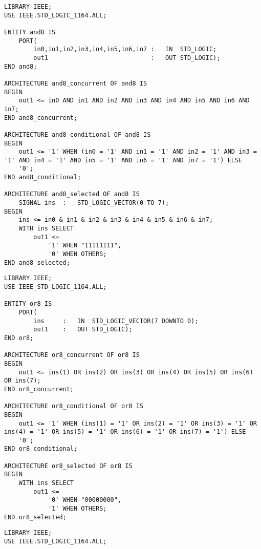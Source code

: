 \begin{enumerate}
	\begin{minipage}{1\linewidth}
		\item
		\begin{lstlisting}
LIBRARY IEEE;
USE IEEE.STD_LOGIC_1164.ALL;

ENTITY and8 IS
	PORT(
		in0,in1,in2,in3,in4,in5,in6,in7	:	IN	STD_LOGIC;
		out1							:	OUT	STD_LOGIC);
END and8;

ARCHITECTURE and8_concurrent OF and8 IS
BEGIN
	out1 <= in0 AND in1 AND in2 AND in3 AND in4 AND in5 AND in6 AND in7;
END and8_concurrent;

ARCHITECTURE and8_conditional OF and8 IS
BEGIN
	out1 <= '1' WHEN (in0 = '1' AND in1 = '1' AND in2 = '1' AND in3 = '1' AND in4 = '1' AND in5 = '1' AND in6 = '1' AND in7 = '1') ELSE
	'0';
END and8_conditional;

ARCHITECTURE and8_selected OF and8 IS
	SIGNAL ins	:	STD_LOGIC_VECTOR(0 TO 7);
BEGIN
	ins <= in0 & in1 & in2 & in3 & in4 & in5 & in6 & in7;
	WITH ins SELECT
		out1 <=
			'1' WHEN "11111111",
			'0' WHEN OTHERS;
END and8_selected;
		\end{lstlisting}
	\end{minipage}

	\begin{minipage}{1\linewidth}
		\item
		\begin{lstlisting}
LIBRARY IEEE;
USE IEEE_STD_LOGIC_1164.ALL;

ENTITY or8 IS
	PORT(
		ins		:	IN	STD_LOGIC_VECTOR(7 DOWNTO 0);
		out1	:	OUT	STD_LOGIC);
END or8;

ARCHITECTURE or8_concurrent OF or8 IS
BEGIN
	out1 <= ins(1) OR ins(2) OR ins(3) OR ins(4) OR ins(5) OR ins(6) OR ins(7);
END or8_concurrent;

ARCHITECTURE or8_conditional OF or8 IS
BEGIN
	out1 <= '1' WHEN (ins(1) = '1' OR ins(2) = '1' OR ins(3) = '1' OR ins(4) = '1' OR ins(5) = '1' OR ins(6) = '1' OR ins(7) = '1') ELSE
	'0';
END or8_conditional;

ARCHITECTURE or8_selected OF or8 IS
BEGIN
	WITH ins SELECT
		out1 <=
			'0' WHEN "00000000",
			'1' WHEN OTHERS;
END or8_selected;
		\end{lstlisting}
	\end{minipage}

	\begin{minipage}{1\linewidth}
		\item
		\begin{lstlisting}
LIBRARY IEEE;
USE IEEE.STD_LOGIC_1164.ALL;


\end{lstlisting}
\end{minipage}
\end{enumerate}
